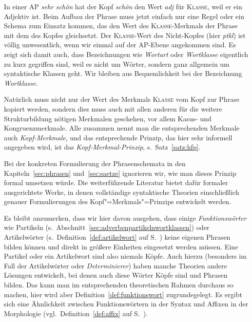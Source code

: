 In einer AP \textit{sehr schön} hat der Kopf \textit{schön} den Wert \textit{adj} für \textsc{Klasse}, weil er ein Adjektiv ist.
Beim Aufbau der Phrase muss jetzt einfach nur eine Regel oder ein Schema zum Einsatz kommen, das den Wert des \textsc{Klasse}-Merkmals der Phrase mit dem des Kopfes gleichsetzt.
Der \textsc{Klasse}-Wert des Nicht-Kopfes (hier \textit{ptkl}) ist völlig unwesentlich, wenn wir einmal auf der AP-Ebene angekommen sind.
Es zeigt sich damit auch, dass Bezeichnungen wie \textit{Wortart} oder \textit{Wortklasse} eigentlich zu kurz gegriffen sind, weil es nicht um Wörter, sondern ganz allgemein um syntaktische Klassen geht.
Wir bleiben aus Bequemlichkeit bei der Bezeichnung \textit{Wortklasse}.

Natürlich muss nicht nur der Wert des Merkmals \textsc{Klasse} vom Kopf zur Phrase kopiert werden, sondern dies muss auch mit allen anderen für die weitere Strukturbildung nötigen Merkmalen geschehen, vor allem Kasus- und Kongruenzmerkmale.
Alle zusammen nennt man die entsprechenden Merkmale auch \textit{Kopf-Merkmale}, und das entsprechende Prinzip, das hier sehr informell angegeben wird, ist das \textit{Kopf-Merkmal-Prinzip}, s.\ Satz~\ref{satz:hfp}.


Bei der konkreten Formulierung der Phrasenschemata in den Kapiteln~\ref{sec:phrasen} und~\ref{sec:saetze} ignorieren wir, wie man dieses Prinzip formal umsetzen würde.
Die weiterführende Literatur bietet dafür formaler ausgerichtete Werke, in denen vollständige syntaktische Theorien einschließlich genauer Formulierungen des Kopf"=Merkmals"=Prinzips entwickelt werden.

Es bleibt anzumerken, dass wir hier davon ausgehen, dass einige \textit{Funktionswörter} wie Partikeln (s.\ Abschnitt~\ref{sec:adverbenpartikelnwortklassen}) oder Artikelwörter (s.\ Definition~\ref{def:artikelwort} auf S.~\pageref{def:artikelwort}) keine eigenen Phrasen bilden können und direkt in größere Einheiten eingesetzt werden müssen.
Eine Partikel oder ein Artikelwort sind also niemals Köpfe.
Auch hierzu (besonders im Fall der Artikelwörter oder \textit{Determinierer}) haben manche Theorien andere Lösungen entwickelt, bei denen auch diese Wörter Köpfe sind und Phrasen bilden.
Das kann man im entsprechenden theoretischen Rahmen durchaus so machen, hier wird aber Definition~\ref{def:funktionswort} zugrundegelegt.
Es ergibt sich eine Ähnlichkeit zwischen Funktionswörtern in der Syntax und Affixen in der Morphologie (vgl.\ Definition~\ref{def:affix} auf S.~\pageref{def:affix}).

